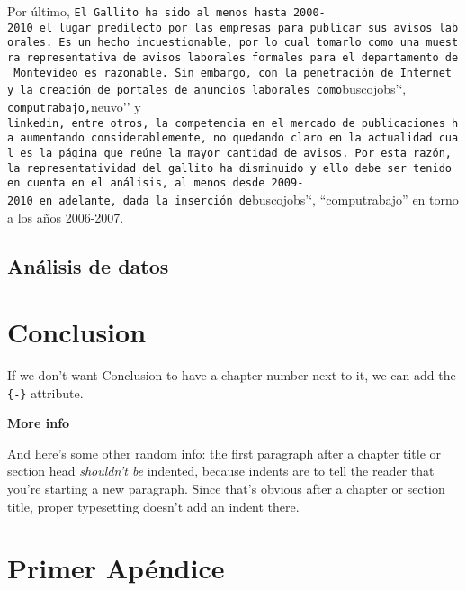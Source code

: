 \documentclass[12pt,twoside]{reedthesis}
\begin{document}
Por último, \texttt{El\ Gallito\textquotesingle{}\textquotesingle{}\ ha\ sido\ al\ menos\ hasta\ 2000-2010\ el\ lugar\ predilecto\ por\ las\ empresas\ para\ publicar\ sus\ avisos\ laborales.\ Es\ un\ hecho\ incuestionable,\ por\ lo\ cual\ tomarlo\ como\ una\ muestra\ representativa\ de\ avisos\ laborales\ formales\ para\ el\ departamento\ de\ Montevideo\ es\ razonable.\ Sin\ embargo,\ con\ la\ penetración\ de\ Internet\ y\ la\ creación\ de\ portales\ de\ anuncios\ laborales\ como}buscojobs'`, \texttt{computrabajo\textquotesingle{}\textquotesingle{},}neuvo'' y \texttt{linkedin\textquotesingle{}\textquotesingle{},\ entre\ otros,\ la\ competencia\ en\ el\ mercado\ de\ publicaciones\ ha\ aumentando\ considerablemente,\ no\ quedando\ claro\ en\ la\ actualidad\ cual\ es\ la\ página\ que\ reúne\ la\ mayor\ cantidad\ de\ avisos.\ Por\ esta\ razón,\ la\ representatividad\ del\ gallito\ ha\ disminuido\ y\ ello\ debe\ ser\ tenido\ en\ cuenta\ en\ el\ análisis,\ al\ menos\ desde\ 2009-2010\ en\ adelante,\ dada\ la\ inserción\ de}buscojobs'`, ``computrabajo'' en torno a los años 2006-2007.

\hypertarget{anuxe1lisis-de-datos}{%
\section*{Análisis de datos}\label{anuxe1lisis-de-datos}}

\hypertarget{conclusion}{%
\chapter*{Conclusion}\label{conclusion}}

If we don't want Conclusion to have a chapter number next to it, we can add the \texttt{\{-\}} attribute.

\textbf{More info}

And here's some other random info: the first paragraph after a chapter title or section head \emph{shouldn't be} indented, because indents are to tell the reader that you're starting a new paragraph. Since that's obvious after a chapter or section title, proper typesetting doesn't add an indent there.

\appendix

\hypertarget{primer-apuxe9ndice}{%
\chapter{Primer Apéndice}\label{primer-apuxe9ndice}}
\end{document}
